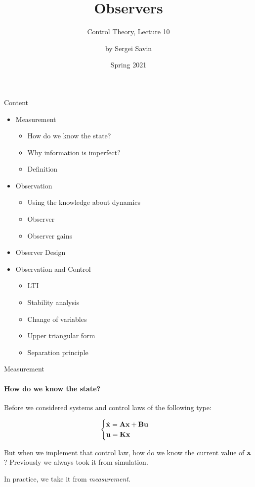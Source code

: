 \documentclass{beamer}
\title{Observers}
\subtitle{Control Theory, Lecture 10}
\author{by Sergei Savin}
\date{Spring 2021}
\begin{document}
\maketitle



\begin{frame}{Content}
\begin{itemize}
\item Measurement
\begin{itemize}
    \item How do we know the state?
    \item Why information is imperfect?
    \item Definition
\end{itemize}
\item Observation
\begin{itemize}
    \item Using the knowledge about dynamics
    \item Observer
    \item Observer gains
\end{itemize}
\item Observer Design
\item Observation and Control
\begin{itemize}
    \item LTI
    \item Stability analysis
    \item Change of variables
    \item Upper triangular form
    \item Separation principle
\end{itemize}
\end{itemize}
\end{frame}




\begin{frame}{Measurement}
\framesubtitle{How do we know the state?}
\begin{flushleft}

Before we considered systems and control laws of the following type:

\begin{equation}
\begin{cases}
\dot {\mathbf{x}} = \mathbf{A} \mathbf{x} + \mathbf{B} \mathbf{u}\\
\mathbf{u} = \mathbf{K} \mathbf{x}
\end{cases}
\end{equation}

But when we implement that control law, how do we know the current value of $\mathbf{x}$? Previously we always took it from simulation. 

\bigskip

In practice, we take it from \emph{measurement}.

\end{flushleft}
\end{frame}
\end{document}
